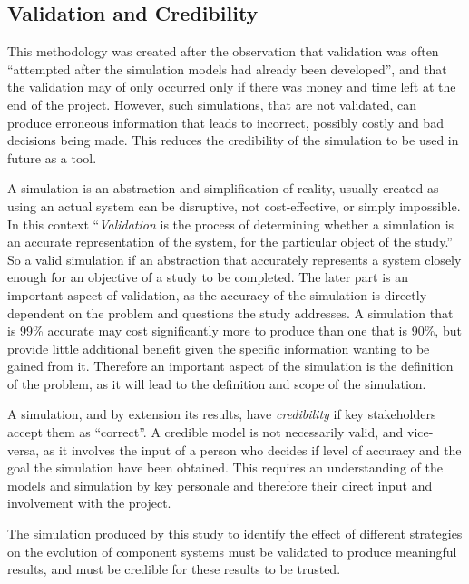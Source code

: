 \subsection{Validation and Credibility}
This methodology was created after the observation that validation was often ``attempted after the simulation models had already been developed'',
and that the validation may of only occurred only if there was money and time left at the end of the project.
However, such simulations, that are not validated, can produce erroneous information that leads to incorrect, possibly costly and bad decisions being made.
This reduces the credibility of the simulation to be used in future as a tool.

A simulation is an abstraction and simplification of reality, usually created as using an actual system can be disruptive, not cost-effective, or simply impossible.
In this context ``\textit{Validation} is the process of determining whether a simulation is an accurate representation of the system, for the particular object of the study.''
So a valid simulation if an abstraction that accurately represents a system closely enough for an objective of a study to be completed.
The later part is an important aspect of validation, as the accuracy of the simulation is directly dependent on the problem and questions the study addresses.
A simulation that is 99\% accurate may cost significantly more to produce than one that is 90\%, but provide little additional benefit given the specific information wanting to be gained from it.
Therefore an important aspect of the simulation is the definition of the problem, as it will lead to the definition and scope of the simulation.

A simulation, and by extension its results, have \textit{credibility} if key stakeholders accept them as ``correct''.
A credible model is not necessarily valid, and vice-versa, as it involves the input of a person who decides if level of accuracy and the goal the simulation have been obtained.
This requires an understanding of the models and simulation by key personale and therefore their direct input and involvement with the project.

The simulation produced by this study to identify the effect of different strategies on the evolution of component systems must be validated to produce meaningful results,
and must be credible for these results to be trusted.


